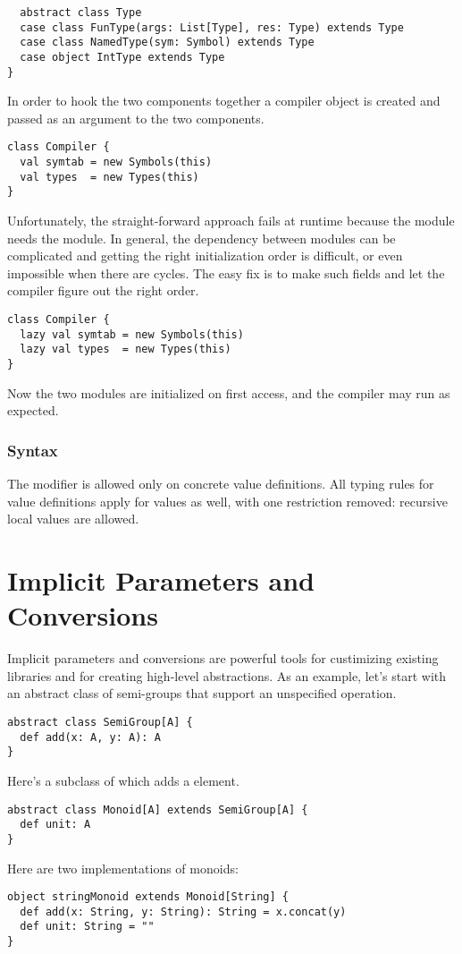 {\begin{lstlisting}
  abstract class Type
  case class FunType(args: List[Type], res: Type) extends Type
  case class NamedType(sym: Symbol) extends Type
  case object IntType extends Type
}
\end{lstlisting}
In order to hook the two components together a compiler object is
created and passed as an argument to the two components. 
\begin{lstlisting}
class Compiler {
  val symtab = new Symbols(this)
  val types  = new Types(this)
}
\end{lstlisting}
Unfortunately, the straight-forward approach fails at runtime because
the \lstinline@symtab@ module needs the \lstinline@types@
module. In general, the dependency between modules can be complicated
and getting the right initialization order is difficult, or even
impossible when there are cycles. The easy fix is to make such fields
\lstinline@lazy@ and let the compiler figure out the right order.
\begin{lstlisting}
class Compiler {
  lazy val symtab = new Symbols(this)
  lazy val types  = new Types(this)
}
\end{lstlisting}
Now the two modules are initialized on first access, and the compiler
may run as expected. 

\subsection*{Syntax}
The \lstinline@lazy@ modifier is allowed only on concrete value
definitions. All typing rules for value definitions apply for
\lstinline@lazy@ values as well, with one restriction removed:
recursive local values are allowed.

\chapter{Implicit Parameters and Conversions}\label{sec:implicits}

Implicit parameters and conversions are powerful tools for
custimizing existing libraries and for creating high-level
abstractions. As an example, let's start with an abstract class of
semi-groups that support an unspecified \lstinline@add@ operation.
\begin{lstlisting}
abstract class SemiGroup[A] {
  def add(x: A, y: A): A
}
\end{lstlisting}
Here's a subclass \lstinline@Monoid@ of \lstinline@SemiGroup@ which adds a
\lstinline@unit@ element.
\begin{lstlisting}
abstract class Monoid[A] extends SemiGroup[A] {
  def unit: A
}
\end{lstlisting}
Here are two implementations of monoids:
\begin{lstlisting}
object stringMonoid extends Monoid[String] {
  def add(x: String, y: String): String = x.concat(y)
  def unit: String = ""
}


\end{lstlisting}}

